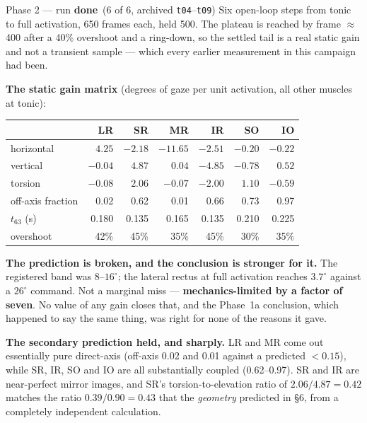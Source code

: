 \documentclass[11pt,a4paper]{article}
\newcommand{\code}[1]{\texttt{#1}}
\newcommand{\dn}{\textcolor{good}{\textbf{done}}}
\begin{document}
\begin{runbox}{Phase 2 --- run \hfill \dn\ (6 of 6, archived \code{t04}--\code{t09})}
Six open-loop steps from tonic to full activation, 650 frames each, held 500. The plateau is
reached by frame $\approx$400 after a 40\% overshoot and a ring-down, so the settled tail is a real
static gain and not a transient sample --- which every earlier measurement in this campaign had
been.

\textbf{The static gain matrix} (degrees of gaze per unit activation, all other muscles at tonic):

\begin{center}\small
\begin{tabular}{@{}lrrrrrr@{}}
\toprule
 & \textbf{LR} & \textbf{SR} & \textbf{MR} & \textbf{IR} & \textbf{SO} & \textbf{IO}\\
\midrule
horizontal & $4.25$ & $-2.18$ & $\mathbf{-11.65}$ & $-2.51$ & $-0.20$ & $-0.22$\\
vertical   & $-0.04$ & $4.87$ & $0.04$ & $-4.85$ & $-0.78$ & $0.52$\\
torsion    & $-0.08$ & $2.06$ & $-0.07$ & $-2.00$ & $\mathbf{1.10}$ & $-0.59$\\
\midrule
off-axis fraction & 0.02 & 0.62 & 0.01 & 0.66 & 0.73 & 0.97\\
$t_{63}$ (s) & 0.180 & 0.135 & 0.165 & 0.135 & 0.210 & 0.225\\
overshoot & 42\% & 45\% & 35\% & 45\% & 30\% & 35\%\\
\bottomrule
\end{tabular}
\end{center}

\begin{tcolorbox}[colback=bad!4,colframe=bad!45,boxrule=0.7pt,arc=2pt]
\textbf{The prediction is broken, and the conclusion is stronger for it.} The registered band was
$8$--$16^\circ$; the lateral rectus at full activation reaches $\mathbf{3.7^\circ}$ against a
$26^\circ$ command. Not a marginal miss --- \textbf{mechanics-limited by a factor of seven}. No
value of any gain closes that, and the Phase~1a conclusion, which happened to say the same thing,
was right for none of the reasons it gave.
\end{tcolorbox}

\textbf{The secondary prediction held, and sharply.} LR and MR come out essentially pure
direct-axis (off-axis 0.02 and 0.01 against a predicted $<0.15$), while SR, IR, SO and IO are all
substantially coupled (0.62--0.97). SR and IR are near-perfect mirror images, and SR's
torsion-to-elevation ratio of $2.06/4.87 = 0.42$ matches the ratio $0.39/0.90 = 0.43$ that the
\emph{geometry} predicted in \S6, from a completely independent calculation.


\end{runbox}
\end{document}

